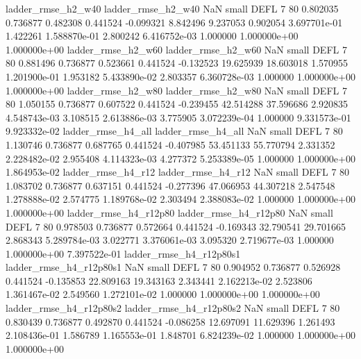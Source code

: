      ladder_rmse_h2_w40       ladder_rmse_h2_w40                   NaN      small     DEFL                 7 80 0.802035       0.736877 0.482308       0.441524   -0.099321      8.842496      9.237053     0.902054   3.697701e-01  1.422261 1.588870e-01     2.800242   6.416752e-03            1.000000    1.000000e+00        1.000000e+00
      ladder_rmse_h2_w60       ladder_rmse_h2_w60                   NaN      small     DEFL                 7 80 0.881496       0.736877 0.523661       0.441524   -0.132523     19.625939     18.603018     1.570955   1.201900e-01  1.953182 5.433890e-02     2.803357   6.360728e-03            1.000000    1.000000e+00        1.000000e+00
      ladder_rmse_h2_w80       ladder_rmse_h2_w80                   NaN      small     DEFL                 7 80 1.050155       0.736877 0.607522       0.441524   -0.239455     42.514288     37.596686     2.920835   4.548743e-03  3.108515 2.613886e-03     3.775905   3.072239e-04            1.000000    9.331573e-01        9.923332e-02
      ladder_rmse_h4_all       ladder_rmse_h4_all                   NaN      small     DEFL                 7 80 1.130746       0.736877 0.687765       0.441524   -0.407985     53.451133     55.770794     2.331352   2.228482e-02  2.955408 4.114323e-03     4.277372   5.253389e-05            1.000000    1.000000e+00        1.864953e-02
      ladder_rmse_h4_r12       ladder_rmse_h4_r12                   NaN      small     DEFL                 7 80 1.083702       0.736877 0.637151       0.441524   -0.277396     47.066953     44.307218     2.547548   1.278888e-02  2.574775 1.189768e-02     2.303494   2.388083e-02            1.000000    1.000000e+00        1.000000e+00
   ladder_rmse_h4_r12p80    ladder_rmse_h4_r12p80                   NaN      small     DEFL                 7 80 0.978503       0.736877 0.572664       0.441524   -0.169343     32.790541     29.701665     2.868343   5.289784e-03  3.022771 3.376061e-03     3.095320   2.719677e-03            1.000000    1.000000e+00        7.397522e-01
 ladder_rmse_h4_r12p80s1  ladder_rmse_h4_r12p80s1                   NaN      small     DEFL                 7 80 0.904952       0.736877 0.526928       0.441524   -0.135853     22.809163     19.343163     2.343441   2.162213e-02  2.523806 1.361467e-02     2.549560   1.272101e-02            1.000000    1.000000e+00        1.000000e+00
 ladder_rmse_h4_r12p80s2  ladder_rmse_h4_r12p80s2                   NaN      small     DEFL                 7 80 0.830439       0.736877 0.492870       0.441524   -0.086258     12.697091     11.629396     1.261493   2.108436e-01  1.586789 1.165553e-01     1.848701   6.824239e-02            1.000000    1.000000e+00        1.000000e+00

